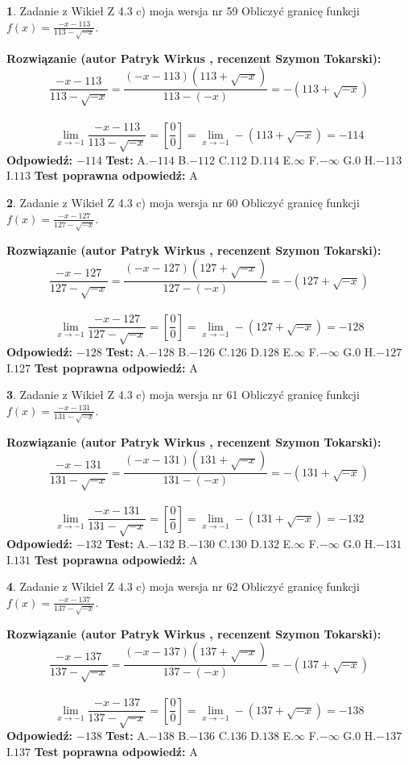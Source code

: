 \documentclass[12pt, a4paper]{article}
\theoremstyle{definition} %
\newtheorem{zad}{}
\newcommand{\zadStart}[1]{\begin{zad}#1\newline}
\newcommand{\zadStop}{\end{zad}}
\newcommand{\rozwStart}[2]{\noindent \textbf{Rozwiązanie (autor #1 , recenzent #2): }\newline}
\newcommand{\rozwStop}{\newline}
\newcommand{\odpStart}{\noindent \textbf{Odpowiedź:}\newline}
\newcommand{\odpStop}{\newline}
\newcommand{\testStart}{\noindent \textbf{Test:}\newline}
\newcommand{\testStop}{\newline}
\newcommand{\kluczStart}{\noindent \textbf{Test poprawna odpowiedź:}\newline}
\newcommand{\kluczStop}{\newline}
\begin{document}
\zadStart{Zadanie z Wikieł Z 4.3 c) moja wersja nr 59}
Obliczyć granicę funkcji $f(x)=\frac{-x-113}{113-\sqrt{-x}}$.
\zadStop
\rozwStart{Patryk Wirkus}{Szymon Tokarski}
$$\frac{-x-113}{113-\sqrt{-x}}=\frac{(-x-113)(113+\sqrt{-x})}{113-(-x)}=-(113+\sqrt{-x})$$
\\
$$\lim\limits_{x\to-1}\frac{-x-113}{113-\sqrt{-x}}=[\frac{0}{0}]=\lim\limits_{x\to-1}-(113+\sqrt{-x}) =-114$$
\rozwStop
\odpStart
$-114$
\odpStop
\testStart
A.$-114$
B.$-112$
C.$112$
D.$114$
E.$\infty$
F.$-\infty$
G.$0$
H.$-113$
I.$113$
\testStop
\kluczStart
A
\kluczStop



\zadStart{Zadanie z Wikieł Z 4.3 c) moja wersja nr 60}
Obliczyć granicę funkcji $f(x)=\frac{-x-127}{127-\sqrt{-x}}$.
\zadStop
\rozwStart{Patryk Wirkus}{Szymon Tokarski}
$$\frac{-x-127}{127-\sqrt{-x}}=\frac{(-x-127)(127+\sqrt{-x})}{127-(-x)}=-(127+\sqrt{-x})$$
\\
$$\lim\limits_{x\to-1}\frac{-x-127}{127-\sqrt{-x}}=[\frac{0}{0}]=\lim\limits_{x\to-1}-(127+\sqrt{-x}) =-128$$
\rozwStop
\odpStart
$-128$
\odpStop
\testStart
A.$-128$
B.$-126$
C.$126$
D.$128$
E.$\infty$
F.$-\infty$
G.$0$
H.$-127$
I.$127$
\testStop
\kluczStart
A
\kluczStop



\zadStart{Zadanie z Wikieł Z 4.3 c) moja wersja nr 61}
Obliczyć granicę funkcji $f(x)=\frac{-x-131}{131-\sqrt{-x}}$.
\zadStop
\rozwStart{Patryk Wirkus}{Szymon Tokarski}
$$\frac{-x-131}{131-\sqrt{-x}}=\frac{(-x-131)(131+\sqrt{-x})}{131-(-x)}=-(131+\sqrt{-x})$$
\\
$$\lim\limits_{x\to-1}\frac{-x-131}{131-\sqrt{-x}}=[\frac{0}{0}]=\lim\limits_{x\to-1}-(131+\sqrt{-x}) =-132$$
\rozwStop
\odpStart
$-132$
\odpStop
\testStart
A.$-132$
B.$-130$
C.$130$
D.$132$
E.$\infty$
F.$-\infty$
G.$0$
H.$-131$
I.$131$
\testStop
\kluczStart
A
\kluczStop



\zadStart{Zadanie z Wikieł Z 4.3 c) moja wersja nr 62}
Obliczyć granicę funkcji $f(x)=\frac{-x-137}{137-\sqrt{-x}}$.
\zadStop
\rozwStart{Patryk Wirkus}{Szymon Tokarski}
$$\frac{-x-137}{137-\sqrt{-x}}=\frac{(-x-137)(137+\sqrt{-x})}{137-(-x)}=-(137+\sqrt{-x})$$
\\
$$\lim\limits_{x\to-1}\frac{-x-137}{137-\sqrt{-x}}=[\frac{0}{0}]=\lim\limits_{x\to-1}-(137+\sqrt{-x}) =-138$$
\rozwStop
\odpStart
$-138$
\odpStop
\testStart
A.$-138$
B.$-136$
C.$136$
D.$138$
E.$\infty$
F.$-\infty$
G.$0$
H.$-137$
I.$137$
\testStop
\kluczStart
A
\kluczStop
\end{document}
